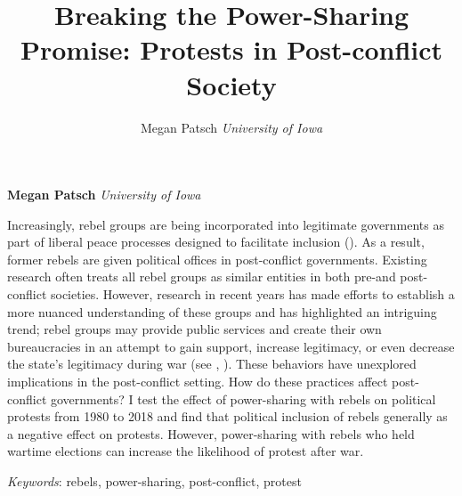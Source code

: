 \documentclass[12pt,]{article}
\title{Breaking the Power-Sharing Promise: Protests in Post-conflict Society }
\author{\Large Megan Patsch\vspace{0.05in} \newline\normalsize\emph{University of Iowa}  }
\date{}
\newcommand*{\authorfont}{\fontfamily{phv}\selectfont}
\renewenvironment{abstract}
 {{%
    \setlength{\leftmargin}{0mm}
    \setlength{\rightmargin}{\leftmargin}%
  }%
  \relax}
 {\endlist}
\begin{document}
	
%

{%
\setlength{\parindent}{0pt}
\thispagestyle{plain}
{\fontsize{18}{20}\selectfont\raggedright 
\maketitle  %

}

{
   \vskip 13.5pt\relax \normalsize\fontsize{11}{12} 
\textbf{\authorfont Megan Patsch} \hskip 15pt \emph{\small University of Iowa}   

}

}








\begin{abstract}

    \hbox{\vrule height .2pt width 39.14pc}

    \vskip 8.5pt %

\noindent Increasingly, rebel groups are being incorporated into legitimate
governments as part of liberal peace processes designed to facilitate
inclusion (\citet{hartzell_institutionalizing_2008}). As a result,
former rebels are given political offices in post-conflict governments.
Existing research often treats all rebel groups as similar entities in
both pre-and post-conflict societies. However, research in recent years
has made efforts to establish a more nuanced understanding of these
groups and has highlighted an intriguing trend; rebel groups may provide
public services and create their own bureaucracies in an attempt to gain
support, increase legitimacy, or even decrease the state's legitimacy
during war (see \citet{stewart_civil_2018},
\citet{terpstra_rebel_2017}). These behaviors have unexplored
implications in the post-conflict setting. How do these practices affect
post-conflict governments? I test the effect of power-sharing with
rebels on political protests from 1980 to 2018 and find that political
inclusion of rebels generally as a negative effect on protests. However,
power-sharing with rebels who held wartime elections can increase the
likelihood of protest after war.


\vskip 8.5pt \noindent \emph{Keywords}: rebels, power-sharing, post-conflict, protest \par

    \hbox{\vrule height .2pt width 39.14pc}



\end{abstract}
\end{document}
